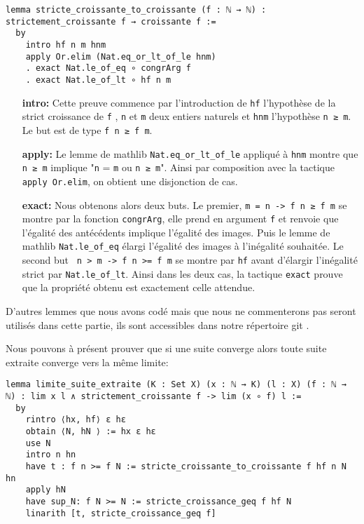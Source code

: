 \documentclass[a4paper, 12pt]{article}
\newcommand{\lean}[1]{\texttt{#1}}
\begin{document}
\begin{verbatim}
lemma stricte_croissante_to_croissante (f : ℕ → ℕ) : strictement_croissante f → croissante f :=
  by
    intro hf n m hnm
    apply Or.elim (Nat.eq_or_lt_of_le hnm)
    . exact Nat.le_of_eq ∘ congrArg f
    . exact Nat.le_of_lt ∘ hf n m
\end{verbatim}


\begin{itemize}[align=left,itemsep=20pt]
    \item[\textbf{intro:}] Cette preuve commence par l'introduction de \lean{hf} l'hypothèse de la strict croissance de \lean{f} , \lean{n} et \lean{m} deux entiers naturels et
    \lean{hnm} l'hypothèse \lean{n ≥ m}. Le but est de type \lean{f n ≥ f m}.
    \item[\textbf{apply:}] Le lemme de mathlib \lean{Nat.eq_or_lt_of_le} appliqué à \lean{hnm} montre que \lean{n ≥ m} implique "\lean{n} = \lean{m} ou \lean{n ≥ m}". Ainsi par composition avec la tactique \lean{apply Or.elim}, on obtient une disjonction de cas.
    \item[\textbf{exact:}] Nous obtenons alors deux buts. Le premier, \lean{m = n -> f n ≥ f m} se montre par la fonction \lean{congrArg}, elle prend en argument \lean{f} et renvoie que l'égalité des antécédents implique l'égalité des images. Puis le lemme de mathlib \lean{Nat.le_of_eq} élargi l'égalité des images à l'inégalité souhaitée. Le second but \lean{ n > m -> f n >= f m} se montre par \lean{hf} avant d'élargir l'inégalité strict par \lean{Nat.le_of_lt}. Ainsi dans les deux cas, la tactique \lean{exact} prouve que la propriété obtenu est exactement celle attendue.
\end{itemize}


\vspace{\baselineskip}

D'autres lemmes que nous avons codé mais que nous ne commenterons pas seront utilisés dans cette partie, ils sont accessibles dans notre répertoire git \cite{git_repo}.

Nous pouvons à présent prouver que si une suite converge alors toute suite extraite converge vers la même limite:

\begin{verbatim}
lemma limite_suite_extraite (K : Set X) (x : ℕ → K) (l : X) (f : ℕ → ℕ) : lim x l ∧ strictement_croissante f -> lim (x ∘ f) l :=
  by
    rintro ⟨hx, hf⟩ ε hε
    obtain ⟨N, hN ⟩ := hx ε hε
    use N
    intro n hn
    have t : f n >= f N := stricte_croissante_to_croissante f hf n N hn
    apply hN
    have sup_N: f N >= N := stricte_croissance_geq f hf N
    linarith [t, stricte_croissance_geq f]
\end{verbatim}
\end{document}
